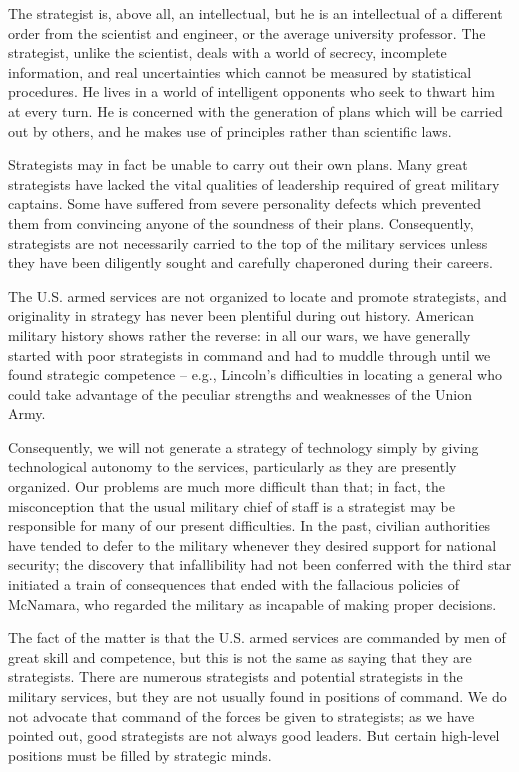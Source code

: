 The strategist is, above all, an intellectual, but he is an intellectual of a different order from the scientist and engineer, or the average university professor. The strategist, unlike the scientist, deals with a world of secrecy, incomplete information, and real uncertainties which cannot be measured by statistical procedures. He lives in a world of intelligent opponents who seek to thwart him at every turn. He is concerned with the generation of plans which will be carried out by others, and he makes use of principles rather than scientific laws.

Strategists may in fact be unable to carry out their own plans. Many great strategists have lacked the vital qualities of leadership required of great military captains. Some have suffered from severe personality defects which prevented them from convincing anyone of the soundness of their plans. Consequently, strategists are not necessarily carried to the top of the military services unless they have been diligently sought and carefully chaperoned during their careers.

The U.S. armed services are not organized to locate and promote strategists, and originality in strategy has never been plentiful during out history. American military history shows rather the reverse: in all our wars, we have generally started with poor strategists in command and had to muddle through until we found strategic competence -- e.g., Lincoln's difficulties in locating a general who could take advantage of the peculiar strengths and weaknesses of the Union Army.

Consequently, we will not generate a strategy of technology simply by giving technological autonomy to the services, particularly as they are presently organized. Our problems are much more difficult than that; in fact, the misconception that the usual military chief of staff is a strategist may be responsible for many of our present difficulties. In the past, civilian authorities have tended to defer to the military whenever they desired support for national security; the discovery that infallibility had not been conferred with the third star initiated a train of consequences that ended with the fallacious policies of McNamara, who regarded the military as incapable of making proper decisions.

The fact of the matter is that the U.S. armed services are commanded by men of great skill and competence, but this is not the same as saying that they are strategists. There are numerous strategists and potential strategists in the military services, but they are not usually found in positions of command. We do not advocate that command of the forces be given to strategists; as we have pointed out, good strategists are not always good leaders. But certain high-level positions must be filled by strategic minds.

